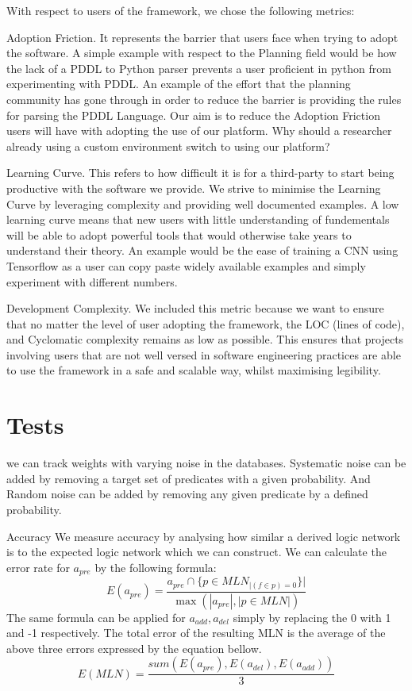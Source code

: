 With respect to users of the framework, we chose the following metrics:

Adoption Friction.
It represents the barrier that users face when trying to adopt the software.
A simple example with respect to the Planning field would be how the lack of a PDDL to Python parser prevents a user proficient in python from experimenting with PDDL.
An example of the effort that the planning community has gone through in order to reduce the barrier is providing the rules for parsing the PDDL Language.
Our aim is to reduce the Adoption Friction users will have with adopting the use of our platform.
Why should a researcher already using a custom environment switch to using our platform?

Learning Curve.
This refers to how difficult it is for a third-party to start being productive with the software we provide.
We strive to minimise the Learning Curve by leveraging complexity and providing well documented examples.
A low learning curve means that new users with little understanding of fundementals will be able to adopt powerful tools that would otherwise take years to understand their theory.
An example would be the ease of training a CNN using Tensorflow as a user can copy paste widely available examples and simply experiment with different numbers.

Development Complexity.
We included this metric because we want to ensure that no matter the level of user adopting the framework, the LOC (lines of code), and Cyclomatic complexity remains as low as possible.
This ensures that projects involving users that are not well versed in software engineering practices are able to use the framework in a safe and scalable way, whilst maximising legibility.

\section{Tests}
we can track weights with varying noise in the databases. Systematic noise can be added by removing a target set of predicates with a given probability. And Random noise can be added by removing any given predicate by a defined probability.

Accuracy
We measure accuracy by analysing how similar a derived logic network is to the expected logic network which we can construct. We can calculate the error rate for \(a_{pre}\) by the following formula:
\[E(a_{pre})=\frac{a_{pre}\cap \{p\in MLN_{|(f\in p) =0}\}|}{\max( |a_{pre}|,|p\in MLN|)}\]
The same formula can be applied for \(a_{add},a_{del}\) simply by replacing the 0 with 1 and -1 respectively. The total error of the resulting MLN is the average of the above three errors expressed by the equation bellow.
\[E(MLN)=\frac{sum(E(a_{pre}),E(a_{del}),E(a_{add}))}{3}\]

